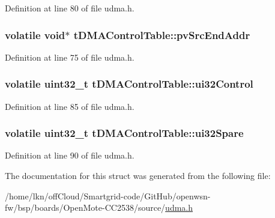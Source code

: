 Definition at line 80 of file udma.\+h.

\subsubsection[{\texorpdfstring{pv\+Src\+End\+Addr}{pvSrcEndAddr}}]{\setlength{\rightskip}{0pt plus 5cm}volatile {\bf void}$\ast$ t\+D\+M\+A\+Control\+Table\+::pv\+Src\+End\+Addr}\hypertarget{structt_d_m_a_control_table_a211c562f9f14e09e84cd8c215e69c7a5}{}\label{structt_d_m_a_control_table_a211c562f9f14e09e84cd8c215e69c7a5}


Definition at line 75 of file udma.\+h.

\subsubsection[{\texorpdfstring{ui32\+Control}{ui32Control}}]{\setlength{\rightskip}{0pt plus 5cm}volatile {\bf uint32\+\_\+t} t\+D\+M\+A\+Control\+Table\+::ui32\+Control}\hypertarget{structt_d_m_a_control_table_a408694668c5a110a70841dcdf90bed3b}{}\label{structt_d_m_a_control_table_a408694668c5a110a70841dcdf90bed3b}


Definition at line 85 of file udma.\+h.

\subsubsection[{\texorpdfstring{ui32\+Spare}{ui32Spare}}]{\setlength{\rightskip}{0pt plus 5cm}volatile {\bf uint32\+\_\+t} t\+D\+M\+A\+Control\+Table\+::ui32\+Spare}\hypertarget{structt_d_m_a_control_table_a4f63f0ed18f20f7b81146ad194a259f9}{}\label{structt_d_m_a_control_table_a4f63f0ed18f20f7b81146ad194a259f9}


Definition at line 90 of file udma.\+h.



The documentation for this struct was generated from the following file\+:\begin{DoxyCompactItemize}
\item 
/home/lkn/off\+Cloud/\+Smartgrid-\/code/\+Git\+Hub/openwsn-\/fw/bsp/boards/\+Open\+Mote-\/\+C\+C2538/source/\hyperlink{udma_8h}{udma.\+h}\end{DoxyCompactItemize}
